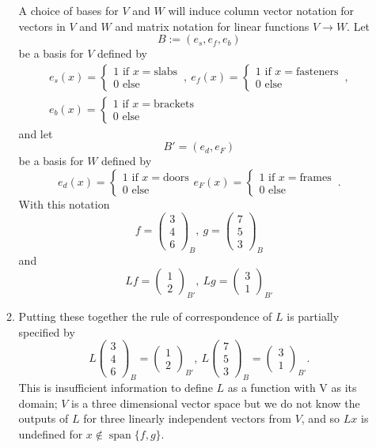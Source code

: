 \documentclass[12pt]{article}
\def\bv{\left(\begin{array}{c}}
\def\ev{\end{array}\right) }
\def\span{ \operatorname{span}}
\begin{document}
\begin{enumerate}
\begin{enumerate}
A choice of bases for $V$ and $W$ will induce column vector notation for vectors in $V$ and $W$ and  matrix notation for linear functions $V\to W$. 
Let 
\[B:=( e_s,e_f,e_b)\] 
be a basis for $V$ defined by 
\begin{gather*}
e_s(x)=\left\{ \begin{array}{l} 1 \text{~if~} x=\text{slabs}\\ 0 \text{~else~} \end{array} \right.\, , ~
e_f(x)=\left\{ \begin{array}{l} 1 \text{~if~} x=\text{fasteners}\\ 0 \text{~else~} \end{array} \right.\, , \\
e_b(x)=\left\{ \begin{array}{l} 1 \text{~if~} x=\text{brackets} \\ 0 \text{~else~} \end{array} \right.
\end{gather*}
and let 
\[B'= ( e_d,e_F)\]
be a basis for $W$ defined by
\[
e_d(x)=\left\{ \begin{array}{l} 1 \text{~if~} x=\text{doors}\\ 0 \text{~else~} \end{array}\right.
e_F(x)=\left\{ \begin{array}{l} 1 \text{~if~} x=\text{frames}\\ 0 \text{~else~} \end{array} \right. \, .
\]
With this notation 
\[f= \bv 3\\4\\6 \ev_B ,~g= \bv 7\\5\\3 \ev_B\]
and
\[ Lf=\bv 1\\2\ev _{B'} , ~Lg=\bv3\\1 \ev _{B'}\]

\item 
Putting these together the rule of correspondence of $L$ is partially specified by
\[ L\bv 3\\4\\6 \ev_B=\bv 1\\2\ev _{B'} , ~L\bv 7\\5\\3 \ev_B=\bv3\\1 \ev _{B'}.\]
This is insufficient information to define $L$ as a function with V as its domain; $V$ is a three dimensional vector space but we do not know the outputs of $L$ for three linearly independent vectors from $V$, 
and so $Lx$ is undefined for $x\notin \span\{ f,g\}$. 


\end{enumerate}
\end{enumerate}
\end{document}
